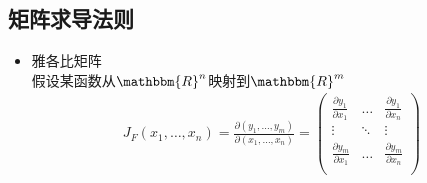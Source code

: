 \documentclass{article} 	%
\begin{document}
	\subsection{矩阵求导法则}
		\begin{itemize}
		\item
		雅各比矩阵\\
		假设某函数从$\mathbbm{R}^n$映射到$\mathbbm{R}^m$
		\begin{eqnarray}
		J_{F}(x_1,\ldots,x_n) = \frac{\partial(y_1,\ldots,y_m)}{\partial(x_1,\ldots,x_n)} =
		\left(
			\begin{array}{ccc}
			\frac{\partial y_1}{\partial x_1}&\ldots&\frac{\partial y_1}{\partial x_n}\\
			\vdots&\ddots&\vdots\\
			\frac{\partial y_m}{\partial x_1}&\ldots&\frac{\partial y_m}{\partial x_n}\\
			\end{array}
		\right)
		\end{eqnarray}
		

\end{itemize}
\end{document}
